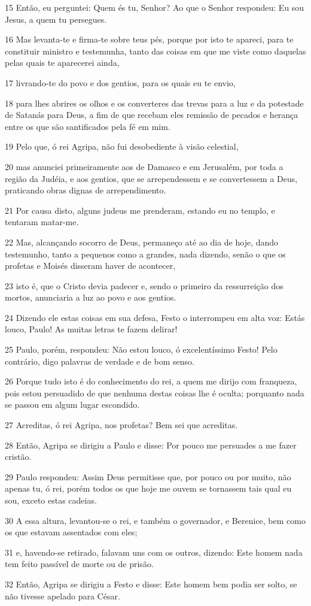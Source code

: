 \par 15 Então, eu perguntei: Quem és tu, Senhor? Ao que o Senhor respondeu: Eu sou Jesus, a quem tu persegues.
\par 16 Mas levanta-te e firma-te sobre teus pés, porque por isto te apareci, para te constituir ministro e testemunha, tanto das coisas em que me viste como daquelas pelas quais te aparecerei ainda,
\par 17 livrando-te do povo e dos gentios, para os quais eu te envio,
\par 18 para lhes abrires os olhos e os converteres das trevas para a luz e da potestade de Satanás para Deus, a fim de que recebam eles remissão de pecados e herança entre os que são santificados pela fé em mim.
\par 19 Pelo que, ó rei Agripa, não fui desobediente à visão celestial,
\par 20 mas anunciei primeiramente aos de Damasco e em Jerusalém, por toda a região da Judéia, e aos gentios, que se arrependessem e se convertessem a Deus, praticando obras dignas de arrependimento.
\par 21 Por causa disto, alguns judeus me prenderam, estando eu no templo, e tentaram matar-me.
\par 22 Mas, alcançando socorro de Deus, permaneço até ao dia de hoje, dando testemunho, tanto a pequenos como a grandes, nada dizendo, senão o que os profetas e Moisés disseram haver de acontecer,
\par 23 isto é, que o Cristo devia padecer e, sendo o primeiro da ressurreição dos mortos, anunciaria a luz ao povo e aos gentios.
\par 24 Dizendo ele estas coisas em sua defesa, Festo o interrompeu em alta voz: Estás louco, Paulo! As muitas letras te fazem delirar!
\par 25 Paulo, porém, respondeu: Não estou louco, ó excelentíssimo Festo! Pelo contrário, digo palavras de verdade e de bom senso.
\par 26 Porque tudo isto é do conhecimento do rei, a quem me dirijo com franqueza, pois estou persuadido de que nenhuma destas coisas lhe é oculta; porquanto nada se passou em algum lugar escondido.
\par 27 Acreditas, ó rei Agripa, nos profetas? Bem sei que acreditas.
\par 28 Então, Agripa se dirigiu a Paulo e disse: Por pouco me persuades a me fazer cristão.
\par 29 Paulo respondeu: Assim Deus permitisse que, por pouco ou por muito, não apenas tu, ó rei, porém todos os que hoje me ouvem se tornassem tais qual eu sou, exceto estas cadeias.
\par 30 A essa altura, levantou-se o rei, e também o governador, e Berenice, bem como os que estavam assentados com eles;
\par 31 e, havendo-se retirado, falavam uns com os outros, dizendo: Este homem nada tem feito passível de morte ou de prisão.
\par 32 Então, Agripa se dirigiu a Festo e disse: Este homem bem podia ser solto, se não tivesse apelado para César.

